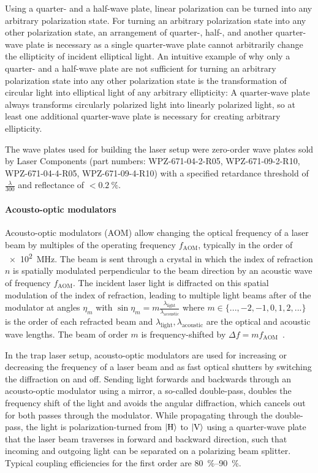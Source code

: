 Using a quarter- and a half-wave plate, linear polarization can be turned into any arbitrary polarization state. For turning an arbitrary polarization state into any other polarization state, an arrangement of quarter-, half-, and another quarter-wave plate is necessary as a single quarter-wave plate cannot arbitrarily change the ellipticity of incident elliptical light. An intuitive example of why only a quarter- and a half-wave plate are not sufficient for turning an arbitrary polarization state into any other polarization state is the transformation of circular light into elliptical light of any arbitrary ellipticity: A quarter-wave plate always transforms circularly polarized light into linearly polarized light, so at least one additional quarter-wave plate is necessary for creating arbitrary ellipticity.

The wave plates used for building the laser setup were zero-order wave plates sold by Laser Components (part numbers:  WPZ-671-04-2-R05, WPZ-671-09-2-R10, WPZ-671-04-4-R05,  WPZ-671-09-4-R10) with a specified retardance threshold of $\frac{\lambda}{300}$ and reflectance of $<\SI{0.2}{\percent}$.
    
\paragraph{Acousto-optic modulators} Acousto-optic modulators (AOM) allow changing the optical frequency of a laser beam by multiples of the operating frequency $f_\text{AOM}$, typically in the order of \SI[]{e2}{\mega\hertz}. The beam is sent through a crystal in which the index of refraction $n$ is spatially modulated perpendicular to the beam direction by an acoustic wave of frequency $f_\text{AOM}$. The incident laser light is diffracted on this spatial modulation of the index of refraction, leading to multiple light beams after of the modulator at angles $\eta_m$ with $\sin \eta_m = m\frac{\lambda_\text{light}}{\lambda_\text{acoustic}}$ where $m \in \{..., -2, -1, 0, 1, 2, ...\}$ is the order of each refracted beam and $\lambda_\text{light}, \lambda_\text{acoustic}$ are the optical and acoustic wave lengths. The beam of order $m$ is frequency-shifted by $\Delta f = mf_\text{AOM}$~\cite{hunsperger_acousto-optic_2002}.

In the trap laser setup, acousto-optic modulators are used for increasing or decreasing the frequency of a laser beam and as fast optical shutters by switching the diffraction on and off. Sending light forwards and backwards through an acousto-optic modulator using a mirror, a so-called double-pass, doubles the frequency shift of the light and avoids the angular diffraction, which cancels out for both passes through the modulator. While propagating through the double-pass, the light is polarization-turned from $\Ket{\text{H}}$ to $\Ket{\text{V}}$ using a quarter-wave plate that the laser beam traverses in forward and backward direction, such that incoming and outgoing light can be separated on a polarizing beam splitter. Typical coupling efficiencies for the first order are \SIrange[]{80}{90}{\percent}.

